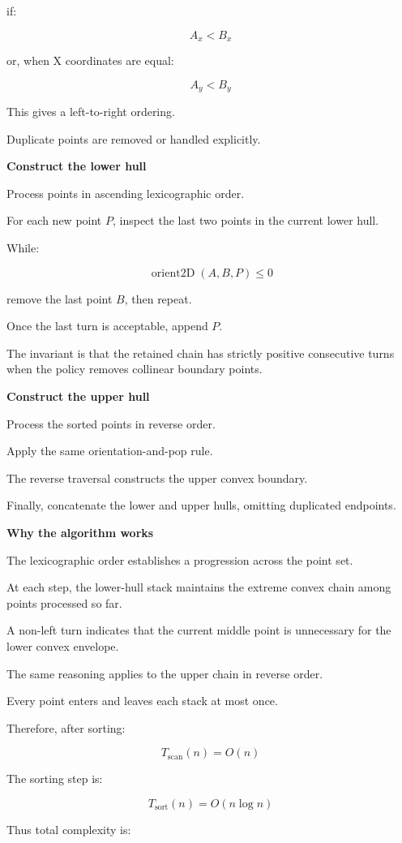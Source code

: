 if:

\[
A_x<B_x
\]

or, when X coordinates are equal:

\[
A_y<B_y
\]

This gives a left-to-right ordering.

Duplicate points are removed or handled explicitly.

\textbf{Construct the lower hull}

Process points in ascending lexicographic order.

For each new point \(P\), inspect the last two points in the current lower hull.

While:

\[
\operatorname{orient2D}(A,B,P)\le0
\]

remove the last point \(B\), then repeat.

Once the last turn is acceptable, append \(P\).

The invariant is that the retained chain has strictly positive consecutive turns when the policy removes collinear boundary points.

\textbf{Construct the upper hull}

Process the sorted points in reverse order.

Apply the same orientation-and-pop rule.

The reverse traversal constructs the upper convex boundary.

Finally, concatenate the lower and upper hulls, omitting duplicated endpoints.

\textbf{Why the algorithm works}

The lexicographic order establishes a progression across the point set.

At each step, the lower-hull stack maintains the extreme convex chain among points processed so far.

A non-left turn indicates that the current middle point is unnecessary for the lower convex envelope.

The same reasoning applies to the upper chain in reverse order.

Every point enters and leaves each stack at most once.

Therefore, after sorting:

\[
T_{\mathrm{scan}}(n)=O(n)
\]

The sorting step is:

\[
T_{\mathrm{sort}}(n)=O(n\log n)
\]

Thus total complexity is:

